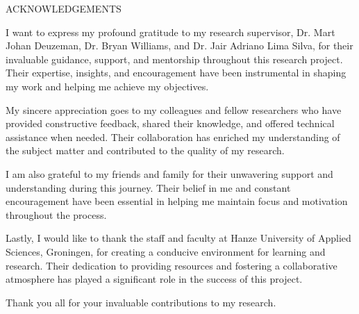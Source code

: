 \begin{center}
    ACKNOWLEDGEMENTS
    \vspace{5mm} %
\end{center}

I want to express my profound gratitude to my research supervisor, Dr. Mart Johan Deuzeman, Dr. Bryan Williams, and Dr. Jair Adriano Lima Silva, for their invaluable guidance, support, and mentorship throughout this research project. Their expertise, insights, and encouragement have been instrumental in shaping my work and helping me achieve my objectives.

My sincere appreciation goes to my colleagues and fellow researchers who have provided constructive feedback, shared their knowledge, and offered technical assistance when needed. Their collaboration has enriched my understanding of the subject matter and contributed to the quality of my research.

I am also grateful to my friends and family for their unwavering support and understanding during this journey. Their belief in me and constant encouragement have been essential in helping me maintain focus and motivation throughout the process.

Lastly, I would like to thank the staff and faculty at Hanze University of Applied Sciences, Groningen, for creating a conducive environment for learning and research. Their dedication to providing resources and fostering a collaborative atmosphere has played a significant role in the success of this project.

\vspace{1em}

Thank you all for your invaluable contributions to my research.
